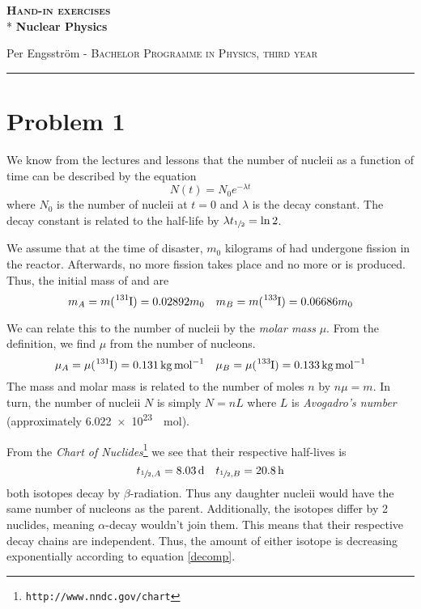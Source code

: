 \documentclass[a4paper, parskip=half, twopage]{scrartcl}
\begin{document}
\Huge \textbf{\textsc{Hand-in exercises}} \\*
\Large \textbf{Nuclear Physics}

\normalsize Per Engsström \hfill {}- \hfill \textsc{Bachelor Programme in Physics, third year} \\
\rule{\textwidth}{1pt}

\bigskip

\section*{Problem 1}
We know from the lectures and lessons that the number of nucleii as a function of time can be described by the equation
\begin{equation}
N(t) = N_0 e^{-\lambda t}
\label{decomp}
\end{equation}
where $N_0$ is the number of nucleii at $t=0$ and $\lambda$ is the decay constant. The decay constant is related to the half-life by $\lambda t_{\sfrac 1 2} = \ln 2$.

We assume that at the time of disaster, $m_0$ kilograms of  had undergone fission in the reactor. Afterwards, no more fission takes place and no more  or  is produced. Thus, the initial mass of  and  are
\[
m_A = m(\ce{^{131}I}) = 0.02892m_0 \quad m_B = m(\ce{^{133}I}) = 0.06686m_0
\]

We can relate this to the number of nucleii by the \emph{molar mass} $\mu$. From the definition, we find $\mu$ from the number of nucleons.
\[
\mu_A = \mu(\ce{^{131}I}) = \SI{0.131}{\kg\per\mole} \quad \mu_B = \mu(\ce{^{133}I}) = \SI{0.133}{\kg\per\mole}
\]
The mass and molar mass is related to the number of moles $n$ by $n \mu = m$. In turn, the number of nucleii $N$ is simply $N = n L$ where $L$ is \emph{Avogadro's number} (approximately \SI{6.022e23}{\per\mole}).

From the \emph{Chart of Nuclides}\footnote{\texttt{http://www.nndc.gov/chart}} we see that their respective half-lives is
\[
t_{\sfrac 1 2, A} = \SI{8.03}{d} \quad t_{\sfrac 1 2, B} = \SI{20.8}{h}
\]
both isotopes decay by $\beta$-radiation. Thus any daughter nucleii would have the same number of nucleons as the parent. Additionally, the isotopes differ by 2 nuclides, meaning $\alpha$-decay wouldn't join them. This means that their respective decay chains are independent. Thus, the amount of either isotope is decreasing exponentially according to equation \ref{decomp}.
\end{document}
